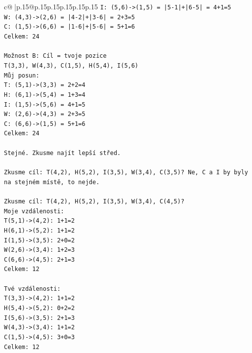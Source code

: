 \documentclass{article}
\begin{document}
{\begin{supertabular}{c@{$\;$}|p{.15\linewidth}@{}p{.15\linewidth}p{.15\linewidth}p{.15\linewidth}p{.15\linewidth}p{.15\linewidth}}
{{{\texttt{I: (5,6){-}>(1,5) = |5{-}1|+|6{-}5| = 4+1=5} \\
\texttt{W: (4,3){-}>(2,6) = |4{-}2|+|3{-}6| = 2+3=5} \\
\texttt{C: (1,5){-}>(6,6) = |1{-}6|+|5{-}6| = 5+1=6} \\
\texttt{Celkem: 24} \\
\\ 
\texttt{Možnost B: Cíl = tvoje pozice} \\
\texttt{T(3,3), W(4,3), C(1,5), H(5,4), I(5,6)} \\
\texttt{Můj posun:} \\
\texttt{T: (5,1){-}>(3,3) = 2+2=4} \\
\texttt{H: (6,1){-}>(5,4) = 1+3=4} \\
\texttt{I: (1,5){-}>(5,6) = 4+1=5} \\
\texttt{W: (2,6){-}>(4,3) = 2+3=5} \\
\texttt{C: (6,6){-}>(1,5) = 5+1=6} \\
\texttt{Celkem: 24} \\
\\ 
\texttt{Stejné. Zkusme najít lepší střed.} \\
\\ 
\texttt{Zkusme cíl: T(4,2), H(5,2), I(3,5), W(3,4), C(3,5)? Ne, C a I by byly na stejném místě, to nejde.} \\
\\ 
\texttt{Zkusme cíl: T(4,2), H(5,2), I(3,5), W(3,4), C(4,5)?} \\
\texttt{Moje vzdálenosti:} \\
\texttt{T(5,1){-}>(4,2): 1+1=2} \\
\texttt{H(6,1){-}>(5,2): 1+1=2} \\
\texttt{I(1,5){-}>(3,5): 2+0=2} \\
\texttt{W(2,6){-}>(3,4): 1+2=3} \\
\texttt{C(6,6){-}>(4,5): 2+1=3} \\
\texttt{Celkem: 12} \\
\\ 
\texttt{Tvé vzdálenosti:} \\
\texttt{T(3,3){-}>(4,2): 1+1=2} \\
\texttt{H(5,4){-}>(5,2): 0+2=2} \\
\texttt{I(5,6){-}>(3,5): 2+1=3} \\
\texttt{W(4,3){-}>(3,4): 1+1=2} \\
\texttt{C(1,5){-}>(4,5): 3+0=3} \\
\texttt{Celkem: 12} \\
}}}
\end{supertabular}}
\end{document}

